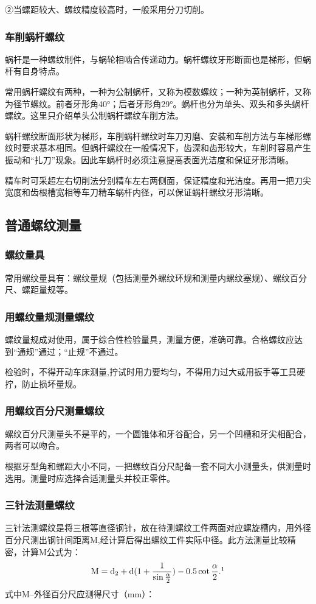 \documentclass{ctexbook}
\begin{document}
②当螺距较大、螺纹精度较高时，一般采用分刀切削。
\subsubsection{车削蜗杆螺纹}
蜗杆是一种螺纹制件，与蜗轮相啮合传递动力。蜗杆螺纹牙形断面也是梯形，但蜗杆有自身特点。

常用蜗杆螺纹有两种，一种为公制蜗杆，又称为模数螺纹；一种为英制蜗杆，又称为径节螺纹。前者牙形角40°；后者牙形角29°。蜗杆也分为单头、双头和多头蜗杆螺纹。这里只介绍单头公制蜗杆螺纹车削方法。

蜗杆螺纹断面形状为梯形，车削蜗杆螺纹时车刀刃磨、安装和车削方法与车梯形螺纹时要求基本相同。但蜗杆螺纹在一般情况下，齿深和齿形较大，车削时容易产生振动和“扎刀”现象。因此车蜗杆时必须注意提高表面光洁度和保证牙形清晰。

精车时可采超左右切削法分别精车左右两侧面，保证精度和光洁度。再用一把刀尖宽度和齿根槽宽相等车刀精车蜗杆内径，可以保证蜗杆螺纹牙形清晰。
\subsection{普通螺纹测量}
\subsubsection{螺纹量具}
常用螺纹量具有：螺纹量规（包括测量外螺纹环规和测量内螺纹塞规）、螺纹百分尺、螺距量规等。
\subsubsection{用螺纹量规测量螺纹}
螺纹量规成对使用，属于综合性检验量具，测量方便，准确可靠。合格螺纹应达到“通规”通过；“止规”不通过。

检验时，不得开动车床测量,拧试时用力要均匀，不得用力过大或用扳手等工具硬拧，防止损坏量规。
\subsubsection{用螺纹百分尺测量螺纹}
螺纹百分尺测量头不是平的，一个圆锥体和牙谷配合，另一个凹槽和牙尖相配合，两者可以吻合。

根据牙型角和螺距大小不同，一把螺纹百分尺配备一套不同大小测量头，供测量时选用。测量时应选择合适测量头并校正零件。
\subsubsection{三针法测量螺纹}
三针法测螺纹是将三根等直径钢针，放在待测螺纹工件两面对应螺旋槽内，用外径百分尺测出钢针间距离M,经计算后得出螺纹工件实际中径。此方法测量比较精密，计算M公式为：
\begin{equation*}
	\text{M}=\text{d$_{2}$}+\text{d}(1+\frac{1}{\sin\frac{\alpha}{2}})-0.5\cot\frac{\alpha}{2} .\footnotemark
\end{equation*}
式中M--外径百分尺应测得尺寸（mm）：
\end{document}
